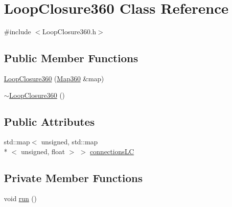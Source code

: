 \hypertarget{classLoopClosure360}{\section{Loop\-Closure360 Class Reference}
\label{classLoopClosure360}
}


{\ttfamily \#include $<$Loop\-Closure360.\-h$>$}

\subsection*{Public Member Functions}
\begin{DoxyCompactItemize}
\item 
\hyperlink{classLoopClosure360_aa533cfa4e5fd3cf5d9dc425fffc861fe}{Loop\-Closure360} (\hyperlink{structMap360}{Map360} \&map)
\item 
\hyperlink{classLoopClosure360_a414fe6292e7c300503eecde1583673b2}{$\sim$\-Loop\-Closure360} ()
\end{DoxyCompactItemize}
\subsection*{Public Attributes}
\begin{DoxyCompactItemize}
\item 
std\-::map$<$ unsigned, std\-::map\\*
$<$ unsigned, float $>$ $>$ \hyperlink{classLoopClosure360_aadd883360701f7c73c1d050a57349037}{connections\-L\-C}
\end{DoxyCompactItemize}
\subsection*{Private Member Functions}
\begin{DoxyCompactItemize}
\item 
void \hyperlink{classLoopClosure360_a804cd7548d55e614444550a748480598}{run} ()
\end{DoxyCompactItemize}
